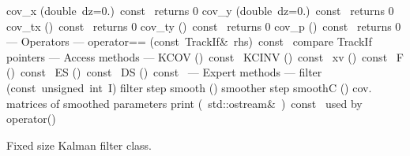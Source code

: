 \documentclass{article}
\begin{document}
\begin{cxxentry}
\begin{cxxclass}
\begin{cxxpublic}
        {cov\_x}
        {(double\ dz=0.)\ const\ }
        { returns 0}
        {}
\label{cxx.2.2.36}
        {cov\_y}
        {(double\ dz=0.)\ const\ }
        { returns 0}
        {}
\label{cxx.2.2.37}
        {cov\_tx}
        {()\ const\ }
        { returns 0}
        {}
\label{cxx.2.2.38}
        {cov\_ty}
        {()\ const\ }
        { returns 0}
        {}
\label{cxx.2.2.39}
        {cov\_p}
        {()\ const\ }
        { returns 0}
        {}
\label{cxx.2.2.40}
\cxxitem{}
        {--- Operators --- }
        {}
        {}
        {}
\label{cxx.2.2.41}
        {operator==}
        {(const\ TrackIf\&\ rhs)\ const\ }
        { compare TrackIf pointers}
        {}
\label{cxx.2.2.42}
\cxxitem{}
        {--- Access methods --- }
        {}
        {}
        {}
\label{cxx.2.2.43}
        {KCOV}
        {()\ const\ }
        {}
        {}
\label{cxx.2.2.44}
        {KCINV}
        {()\ const\ }
        {}
        {}
\label{cxx.2.2.45}
        {xv}
        {()\ const\ }
        {}
        {}
\label{cxx.2.2.46}
        {F}
        {()\ const\ }
        {}
        {}
\label{cxx.2.2.47}
        {ES}
        {()\ const\ }
        {}
        {}
\label{cxx.2.2.48}
        {DS}
        {()\ const\ }
        {}
        {}
\label{cxx.2.2.49}
\cxxitem{}
        {--- Expert methods --- }
        {}
        {}
        {}
\label{cxx.2.2.50}
        {filter}
        {(const\ unsigned\ int\ I)}
        { filter step}
        {}
\label{cxx.2.2.51}
        {smooth}
        {()}
        { smoother step}
        {}
\label{cxx.2.2.52}
        {smoothC}
        {()}
        { cov. matrices of smoothed parameters}
        {}
\label{cxx.2.2.53}
        {print}
        {(\ std::ostream\&\ )\ const\ }
        { used by operator\<\<()}
        {}
\label{cxx.2.2.54}
\end{cxxpublic}
\begin{cxxdoc}
Fixed size Kalman filter class.


\end{cxxdoc}
\end{cxxclass}
\end{cxxentry}
\end{document}
